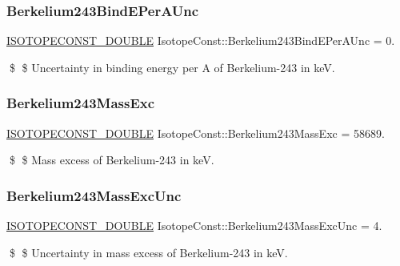 \subsubsection{\texorpdfstring{Berkelium243\+Bind\+E\+Per\+A\+Unc}{Berkelium243BindEPerAUnc}}
{\footnotesize\ttfamily \mbox{\hyperlink{group___isotope_const-_macros_ga8f45a7272ce02c0b4c65c44636ed719a}{I\+S\+O\+T\+O\+P\+E\+C\+O\+N\+S\+T\+\_\+\+D\+O\+U\+B\+LE}} Isotope\+Const\+::\+Berkelium243\+Bind\+E\+Per\+A\+Unc = 0.}

\$ \$ Uncertainty in binding energy per A of Berkelium-\/243 in keV. \mbox{\label{group___isotope_const-_berkelium-_bk243_ga053886401dcf205c76dc3679370decd6}} 
\subsubsection{\texorpdfstring{Berkelium243\+Mass\+Exc}{Berkelium243MassExc}}
{\footnotesize\ttfamily \mbox{\hyperlink{group___isotope_const-_macros_ga8f45a7272ce02c0b4c65c44636ed719a}{I\+S\+O\+T\+O\+P\+E\+C\+O\+N\+S\+T\+\_\+\+D\+O\+U\+B\+LE}} Isotope\+Const\+::\+Berkelium243\+Mass\+Exc = 58689.}

\$ \$ Mass excess of Berkelium-\/243 in keV. \mbox{\label{group___isotope_const-_berkelium-_bk243_ga6fbe1a3ac983ab6b5d441f6eea6a4fa4}} 
\subsubsection{\texorpdfstring{Berkelium243\+Mass\+Exc\+Unc}{Berkelium243MassExcUnc}}
{\footnotesize\ttfamily \mbox{\hyperlink{group___isotope_const-_macros_ga8f45a7272ce02c0b4c65c44636ed719a}{I\+S\+O\+T\+O\+P\+E\+C\+O\+N\+S\+T\+\_\+\+D\+O\+U\+B\+LE}} Isotope\+Const\+::\+Berkelium243\+Mass\+Exc\+Unc = 4.}

\$ \$ Uncertainty in mass excess of Berkelium-\/243 in keV. \mbox{\label{group___isotope_const-_berkelium-_bk243_ga763213bf7d6c3b76aeb6a92856cf2d30}} 
